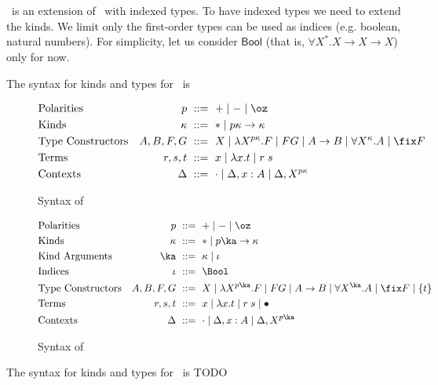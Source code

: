 \section{\Fixi}
\Fixi\ is an extension of \Fixw\ with indexed types.
To have indexed types we need to extend the kinds.
We limit only the first-order types can be used as indices
(e.g. boolean, natural numbers).
For simplicity, let us consider $\mathsf{Bool}$
(that is, $\forall X^*.X\to X\to X$) only for now.


The syntax for kinds and types for \Fixw\ is
\begin{figure}
\begin{align*}
&\text{Polarities}
	& p		&~ ::= ~ + \mid - \mid \oz
\\
&\text{Kinds}
	& \kappa	&~ ::= ~ * \mid p\kappa \to \kappa
\\
&\text{Type Constructors}
	& A,B,F,G	&~ ::= ~ X
			\mid \lambda X^{p\kappa}.F
			\mid F G
			\mid A\to B
			\mid \forall X^\kappa . A
			\mid \fix F
\\
&\text{Terms}
	& r,s,t		&~ ::= ~ x \mid \lambda x.t \mid r\;s
\\
&\text{Contexts}
	& \Delta	&~ ::= ~ \cdot
			\mid \Delta, x:A
			\mid \Delta, X^{p\kappa}
\end{align*}
\caption{Syntax of \Fixw}
\label{fig:syntaxFixw}
\end{figure}

\begin{figure}
\begin{align*}
&\text{Polarities}
	& p			&~ ::= ~ + \mid - \mid \oz
\\
&\text{Kinds}
 	& \kappa		&~ ::= ~ *
				\mid  p\ka \to \kappa
\\
&\text{Kind Arguments}
	& \ka	&~ ::= ~ \kappa \mid \iota
\\
&\text{Indices}
	& \iota &~::=~ \Bool %
\\
&\text{Type Constructors}
	& A,B,F,G		&~ ::= ~ X
				\mid \lambda X^{p\ka}.F
				\mid F G
				\mid A\to B
				\mid \forall X^\ka . A
				\mid \fix F
				\mid \{t\}
\\
&\text{Terms}
	& r,s,t			&~ ::= ~ x \mid \lambda x.t \mid r\;s
				\mid \bullet
\\
&\text{Contexts}
	& \Delta		&~ ::= ~ \cdot
				\mid \Delta, x : A
				\mid \Delta, X^{p\ka}
\end{align*}
\caption{Syntax of \Fixi}
\label{fig:syntaxFixi}
\end{figure}

The syntax for kinds and types for \Fixi\ is TODO


